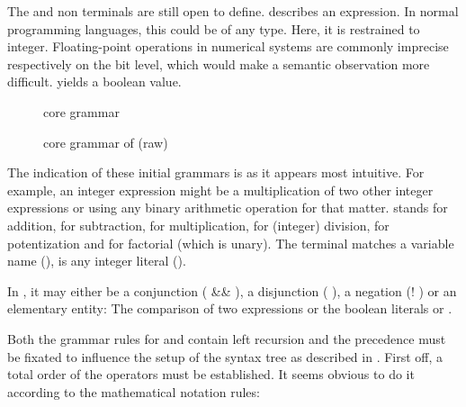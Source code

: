 The  and  non terminals are still open to define.  describes an expression. In normal programming languages, this could be of any type. Here, it is restrained to integer. Floating-point operations in numerical systems are commonly imprecise respectively on the bit level, which would make a semantic observation more difficult.  yields a boolean value.

\begin{figure}
	
	
	\caption{core  grammar}
	\label{fig:grammar_core_exp_raw}
\end{figure}

\begin{figure}
	\centering
	
	
	
	\caption{core grammar of  (raw)}
	\label{fig:grammar_core_bool_exp_raw}
\end{figure}

The indication of these initial grammars is as it appears most intuitive. For example, an integer expression might be a multiplication of two other integer expressions or using any binary arithmetic operation for that matter. \textterminal{+} stands for addition, \textterminal{-} for subtraction, \textterminal{*} for multiplication, \textterminal{/} for (integer) division, \textterminal{\^{}} for potentization and \textterminal{!} for factorial (which is unary). The terminal  matches a variable name (\textregex{[a-zA-Z][a-zA-Z0-9]*}),  is any integer literal ().

In , it may either be a conjunction ( \&\& ), a disjunction ( \textbar{}\textbar{} ), a negation (! ) or an elementary entity: The comparison of two  expressions or the boolean literals  or .

Both the grammar rules for  and  contain left recursion and the precedence must be fixated to influence the setup of the syntax tree as described in . First off, a total order of the operators must be established. It seems obvious to do it according to the mathematical notation rules:

